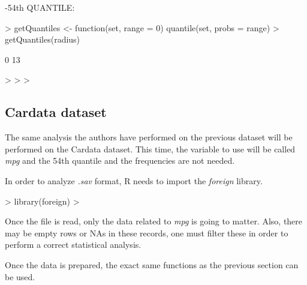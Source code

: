 \documentclass[a4paper]{article}
\begin{document}
-54th QUANTILE:



\begin{Schunk}
\begin{Sinput}
> getQuantiles <- function(set, range = 0) {quantile(set, probs = range)}
> getQuantiles(radius)
\end{Sinput}
\begin{Soutput}
0% 
13 
\end{Soutput}
\begin{Sinput}
> 
> 
> 
\end{Sinput}
\end{Schunk}






\subsection*{Cardata dataset}

The same analysis the authors have performed on the previous dataset will be
performed on the Cardata dataset. This time, the variable to use will be called
\textit{mpg} and the 54th quantile and the frequencies are not needed.


In order to analyze \textit{.sav} format, R needs to import the \textit{foreign}
library. 

\begin{Schunk}
\begin{Sinput}
> library(foreign)
> 
\end{Sinput}
\end{Schunk}


Once the file is read, only the data related to \textit{mpg} is going to matter.
Also, there may be empty rows or NAs in these records, one must filter these in
order to perform a correct statistical analysis.

\begin{Schunk}
\end{Schunk}

Once the data is prepared, the exact same functions as the previous section can
be used.
\end{document}
